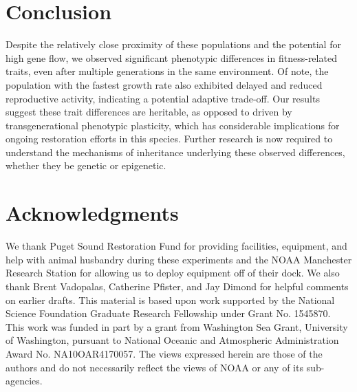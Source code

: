 \documentclass[10pt,letterpaper]{article}
\begin{document}
\section*{Conclusion}
Despite the relatively close proximity of these populations and the potential for high gene flow, we observed significant phenotypic differences in fitness-related traits, even after multiple generations in the same environment. Of note, the population with the fastest growth rate also exhibited delayed and reduced reproductive activity, indicating a potential adaptive trade-off. Our results suggest these trait differences are heritable, as opposed to driven by transgenerational phenotypic plasticity, which has considerable implications for ongoing restoration efforts in this species. Further research is now required to understand the mechanisms of inheritance underlying these observed differences, whether they be genetic or epigenetic. 

\section*{Acknowledgments}
We thank Puget Sound Restoration Fund for providing facilities, equipment, and help with animal husbandry during these experiments and the NOAA Manchester Research Station for allowing us to deploy equipment off of their dock. We also thank Brent Vadopalas, Catherine Pfister, and Jay Dimond for helpful comments on earlier drafts. This material is based upon work supported by the National Science Foundation Graduate Research Fellowship under Grant No. 1545870. This work was funded in part by a grant from Washington Sea Grant, University of Washington, pursuant to National Oceanic and Atmospheric Administration Award No. NA10OAR4170057. The views expressed herein are those of the authors and do not necessarily reflect the views of NOAA or any of its sub-agencies.
\end{document}
